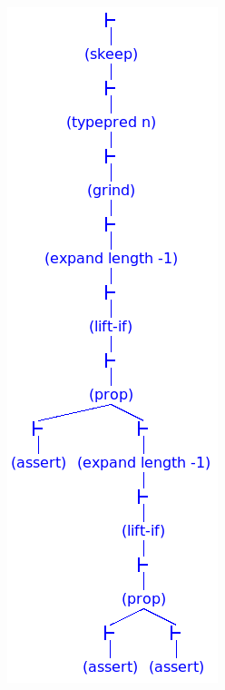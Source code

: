 \begin{figure}[H]
\begin{minipage}{0.45\linewidth}
    \centering
    \includegraphics[height=0.4\textheight,width=0.8\linewidth,trim={0 9.7cm 0 0},clip]{figures/bubbling-tcc3.png}

\end{minipage}
\end{figure}
